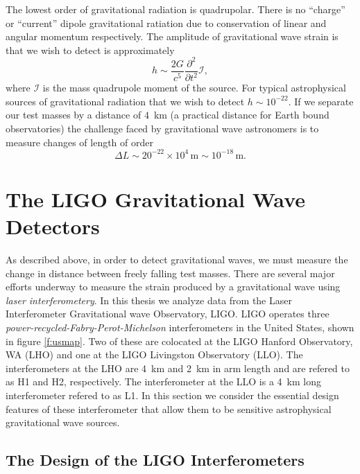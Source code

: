 The lowest order of gravitational radiation is quadrupolar. There is no
``charge'' or ``current'' dipole gravitational ratiation due to conservation
of linear and angular momentum respectively. The amplitude of gravitational
wave strain is that we wish to detect is approximately\cite{thorne.k:1987}
\begin{equation}
h \sim \frac{2G}{c^5} \frac{\partial^2}{\partial t^2} \mathcal{I},
\end{equation}
where $\mathcal{I}$ is the mass quadrupole moment of the source. For typical
astrophysical sources of gravitational radiation that we wish to detect $h
\sim 10^{-22}$. If we separate our test masses by a distance of $4$~km (a
practical distance for Earth bound observatories) the challenge faced by
gravitational wave astronomers is to measure changes of length of order
\begin{equation}
\Delta L \sim 20^{-22} \times 10^4\,\mathrm{m} \sim 10^{-18}\,\mathrm{m}.
\end{equation}

\section{The LIGO Gravitational Wave Detectors}
\label{s:ifos}

As described above, in order to detect gravitational waves, we must measure
the change in distance between freely falling test masses. There are several
major efforts underway\cite{Barish:1999,Acernese:2002,Luck:1997hv} to measure
the strain produced by a gravitational wave using \emph{laser
interferometery}. In this thesis we analyze data from the Laser Interferometer
Gravitational wave Observatory, LIGO. LIGO operates three
\emph{power-recycled-Fabry-Perot-Michelson} interferometers in the United
States, shown in figure \ref{f:usmap}. Two of these are colocated at the LIGO
Hanford Observatory, WA (LHO) and one at the LIGO Livingston Observatory
(LLO). The interferometers at the LHO are 4~km and 2~km in arm length and are
refered to as H1 and H2, respectively. The interferometer at the LLO is a 4~km
long interferometer refered to as L1.  In this section we consider the
essential design features of these interferometer that allow them to be
sensitive astrophysical gravitational wave sources.

\subsection{The Design of the LIGO Interferometers}
\label{ss:ligoifos}

